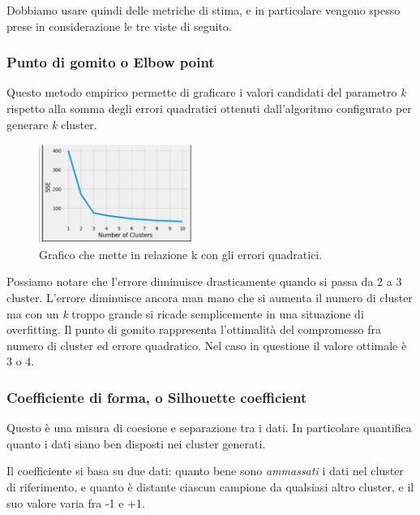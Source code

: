         Dobbiamo usare quindi delle metriche di stima, e in particolare vengono spesso prese in considerazione le tre viste di seguito.
        
        \subsubsection{Punto di gomito o Elbow point}
            Questo metodo empirico permette di graficare i valori candidati del parametro \textit{k} rispetto alla somma degli errori quadratici ottenuti dall'algoritmo configurato per generare \textit{k} cluster.
                    
            \begin{figure}[h]
                \centering
                \includegraphics[width=0.45\textwidth]{img/img3.png}
                \caption{Grafico che mette in relazione k con gli errori quadratici.}
                \label{fig:un_agente}
            \end{figure}
            
            Possiamo notare che l'errore diminuisce drasticamente quando si passa da 2 a 3 cluster. L'errore diminuisce ancora man mano che si aumenta il numero di cluster ma con un \textit{k} troppo grande si ricade semplicemente in una situazione di overfitting. Il punto di gomito rappresenta l'ottimalità del compromesso fra numero di cluster ed errore quadratico. Nel caso in questione il valore ottimale è 3 o 4.
            
        \subsubsection{Coefficiente di forma, o Silhouette coefficient}
            Questo è una misura di coesione e separazione tra i dati. In particolare quantifica quanto i dati siano ben disposti nei cluster generati.
            
            Il coefficiente si basa su due dati: quanto bene sono \textit{ammassati} i dati nel cluster di riferimento, e quanto è distante ciascun campione da qualsiasi altro cluster, e il suo valore varia fra -1 e +1.
            

